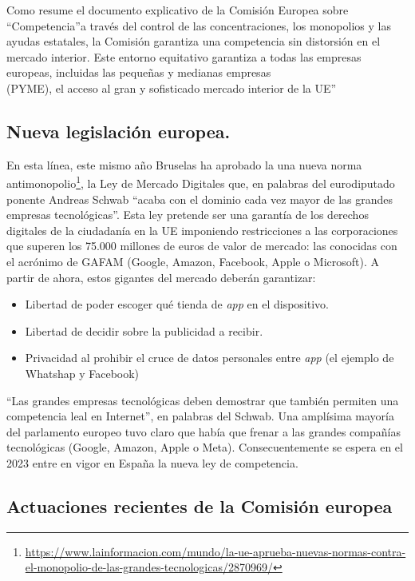 \documentclass[
]{article}
\begin{document}
Como resume el documento explicativo de la Comisión Europea sobre
``Competencia''a través del control de las concentraciones, los
monopolios y las ayudas estatales, la Comisión garantiza una competencia
sin distorsión en el mercado interior. Este entorno equitativo garantiza
a todas las empresas europeas, incluidas las pequeñas y medianas
empresas\\
(PYME), el acceso al gran y sofisticado mercado interior de la UE''

\hypertarget{nueva-legislaciuxf3n-europea.}{%
\subsection{Nueva legislación
europea.}\label{nueva-legislaciuxf3n-europea.}}

En esta línea, este mismo año Bruselas ha aprobado la una nueva norma
antimonopolio\footnote{\url{https://www.lainformacion.com/mundo/la-ue-aprueba-nuevas-normas-contra-el-monopolio-de-las-grandes-tecnologicas/2870969/}},
la Ley de Mercado Digitales que, en palabras del eurodiputado ponente
Andreas Schwab ``acaba con el dominio cada vez mayor de las grandes
empresas tecnológicas''. Esta ley pretende ser una garantía de los
derechos digitales de la ciudadanía en la UE imponiendo restricciones a
las corporaciones que superen los 75.000 millones de euros de valor de
mercado: las conocidas con el acrónimo de GAFAM (Google, Amazon,
Facebook, Apple o Microsoft). A partir de ahora, estos gigantes del
mercado deberán garantizar:

\begin{itemize}
\item
  Libertad de poder escoger qué tienda de \emph{app} en el dispositivo.
\item
  Libertad de decidir sobre la publicidad a recibir.
\item
  Privacidad al prohibir el cruce de datos personales entre \emph{app}
  (el ejemplo de Whatshap y Facebook)
\end{itemize}

``Las grandes empresas tecnológicas deben demostrar que también permiten
una competencia leal en Internet'', en palabras del Schwab. Una
amplísima mayoría del parlamento europeo tuvo claro que había que frenar
a las grandes compañías tecnológicas (Google, Amazon, Apple o Meta).
Consecuentemente se espera en el 2023 entre en vigor en España la nueva
ley de competencia.

\hypertarget{actuaciones-recientes-de-la-comisiuxf3n-europea}{%
\subsection*{Actuaciones recientes de la Comisión
europea}\label{actuaciones-recientes-de-la-comisiuxf3n-europea}}
\end{document}
